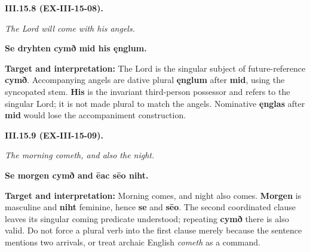 \par\begin{minipage}{\linewidth}\raggedright
\textbf{III.15.8 (EX-III-15-08).}

\emph{The Lord will come with his angels.}

\textbf{Se dryhten cymð mid his ęnglum.}

\textbf{Target and interpretation:} The Lord is the singular subject of future-reference \textbf{cymð}. Accompanying angels are dative plural \textbf{ęnglum} after \textbf{mid}, using the syncopated stem. \textbf{His} is the invariant third-person possessor and refers to the singular Lord; it is not made plural to match the angels. Nominative \textbf{ęnglas} after \textbf{mid} would lose the accompaniment construction.

\end{minipage}\par\addvspace{4pt}

\par\begin{minipage}{\linewidth}\raggedright
\textbf{III.15.9 (EX-III-15-09).}

\emph{The morning cometh, and also the night.}

\textbf{Se morgen cymð and ēac sēo niht.}

\textbf{Target and interpretation:} Morning comes, and night also comes. \textbf{Morgen} is masculine and \textbf{niht} feminine, hence \textbf{se} and \textbf{sēo}. The second coordinated clause leaves its singular coming predicate understood; repeating \textbf{cymð} there is also valid. Do not force a plural verb into the first clause merely because the sentence mentions two arrivals, or treat archaic English \emph{cometh} as a command.

\end{minipage}\par\addvspace{4pt}

